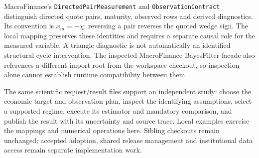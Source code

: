 MacroFinance's \texttt{DirectedPairMeasurement} and
\texttt{ObservationContract} distinguish directed quote pairs, maturity,
observed rows and derived diagnostics. Its convention is $x_m=-\chi$;
reversing a pair reverses the quoted wedge sign. The local mapping preserves
these identities and requires a separate causal role for the measured
variable. A triangle diagnostic is not automatically an identified structural
cycle intervention. The inspected MacroFinance BayesFilter facade also
references a different import root from the workspace checkout, so inspection
alone cannot establish runtime compatibility between them.

The same scientific request/result files support an independent study:
choose the economic target and observation plan, inspect the identifying
assumptions, select a supported regime, execute its estimator and mandatory
comparison, and publish the result with its uncertainty and source trace.
Local examples exercise the mappings and numerical operations here. Sibling
checkouts remain unchanged; accepted adoption, shared release management and
institutional data access remain separate implementation work.
